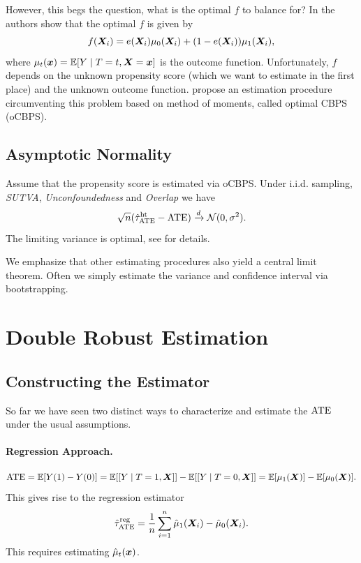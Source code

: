\documentclass[11pt]{exam}
\begin{document}
However, this begs the question, what is the optimal $f$ to balance for? In \citet{fan2022optimal} the authors show that the optimal $f$ is given by
\[
    f(\bm{X}_i) = e(\bm{X}_i) \mu_0(\bm{X}_i) + (1 - e(\bm{X}_i)) \mu_1(\bm{X}_i),
\]
where $\mu_t(\bm{x}) = \mathbb{E}[Y \mid T=t, \bm{X}=\bm{x}]$ is the outcome function. Unfortunately, $f$ depends on the unknown propensity score (which we want to estimate in the first place) and the unknown outcome function. \citet{fan2022optimal} propose an estimation procedure circumventing this problem based on method of moments, called optimal CBPS (oCBPS).

\subsection{Asymptotic Normality}
\begin{theorem}
    Assume that the propensity score is estimated via oCBPS. Under i.i.d. sampling, \emph{SUTVA}, \emph{Unconfoundedness} and \emph{Overlap} we have 
    \[
        \sqrt{n}(\hat \tau_{\mathrm{ATE}}^{\mathrm{ht}} - \mathrm{ATE} ) \xrightarrow{d} \mathcal{N}(0, \sigma^2).
    \]
    The limiting variance is optimal, see \cite{fan2022optimal} for details.
\end{theorem}
\noindent
We emphasize that other estimating procedures also yield a central limit theorem.
Often we simply estimate the variance and confidence interval via bootstrapping.

\section{Double Robust Estimation}

\subsection{Constructing the Estimator}

So far we have seen two distinct ways to characterize  and estimate the $\mathrm{ATE}$ under the usual assumptions.

\paragraph{Regression Approach.}
\[
    \mathrm{ATE} = \mathbb{E}[Y(1) - Y(0)] = \mathbb{E}[[Y \mid T = 1, \bm{X}]] - \mathbb{E}[[Y \mid T = 0, \bm{X}]] = \mathbb{E}[\mu_1(\bm{X})] - \mathbb{E}[\mu_0(\bm{X})]. 
\]
This gives rise to the regression estimator
\[
    \hat \tau_{\mathrm{ATE}}^{\mathrm{reg}} = \frac{1}{n} \sum_{i=1}^n \hat \mu_1(\bm{X}_i) - \hat \mu_0(\bm{X}_i).
\]
This requires estimating $\hat \mu_t(\bm{x})$.
\end{document}
